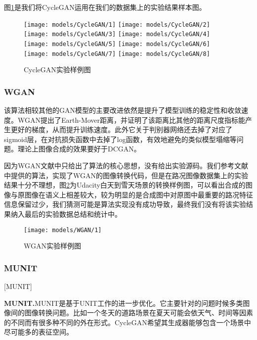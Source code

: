 图\ref{fig:cyclegan}是我们将CycleGAN运用在我们的数据集上的实验结果样本图。 

\begin{figure}[h]
    \centering
    \texttt{[image: models/CycleGAN/1]}
    \texttt{[image: models/CycleGAN/2]}
    \texttt{[image: models/CycleGAN/3]}
    \texttt{[image: models/CycleGAN/4]}
    \texttt{[image: models/CycleGAN/5]}
    \texttt{[image: models/CycleGAN/6]}\texttt{[image: models/CycleGAN/7]}
    \texttt{[image: models/CycleGAN/8]}
    \caption{CycleGAN实验样例图}
    \label{fig:cyclegan}
\end{figure} 


\subsubsection{WGAN}

 该算法相较其他的GAN模型的主要改进依然是提升了模型训练的稳定性和收敛速度。WGAN提出了Earth-Mover距离，并证明了该距离比其他的距离尺度指标能产生更好的梯度，从而提升训练速度。此外它关于判别器网络还去掉了对应了sigmoid层，在对抗损失函数中去掉了log函数，有效地避免的类似模型塌缩等问题。理论上图像合成的效果要好于DCGAN。

因为WGAN文献中只给出了算法的核心思想，没有给出实验源码。我们参考文献中提供的算法，实现了WGAN的图像转换代码，但是在路况图像数据集上的实验结果十分不理想，图\ref{fig:wgan}为Udacity白天到雪天场景的转换样例图，可以看出合成的图像与原图像在语义上相差较大，较为明显的是合成图中对原图中最重要的路况特征信息保留过少，我们猜测可能是算法实现没有成功导致，最终我们没有将该实验结果纳入最后的实验数据总结和统计中。

\begin{figure}[ht]
    \centering
    \texttt{[image: models/WGAN/1]}
    \caption{WGAN实验样例图}
    \label{fig:wgan}
\end{figure}

\subsubsection{MUNIT}[MUNIT]

\textbf{MUNIT.}\cite{MUNIT}\quad MUNIT是基于UNIT\cite{UNIT}工作的进一步优化。它主要针对的问题时候多类图像间的图像转换问题。比如一个冬天的道路场景在夏天可能会依天气、时间等因素的不同而有很多种不同的外在形式。CycleGAN希望其生成器能够包含一个场景中尽可能多的表征空间。

